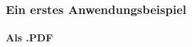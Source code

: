
%
%
%
%


\begin{frame}
\frametitle{Ein erstes Anwendungsbeispiel}
\framesubtitle{Als .PDF}
\begin{columns}
\begin{column}{0.55\textwidth}
\begin{ttfamily}\footnotesize

 \normalsize
\end{ttfamily}
\end{column}

\begin{column}{0.45\textwidth}
\end{column}
\end{columns}
\end{frame}

